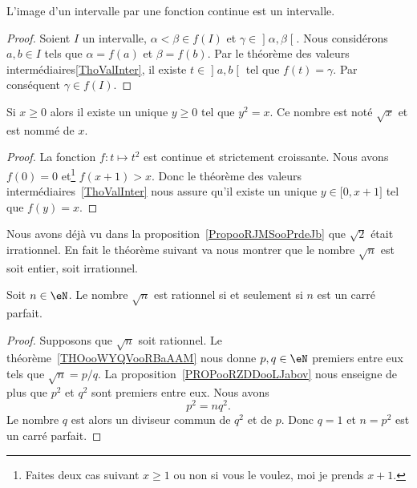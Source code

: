 \begin{corollary}       \label{CorImInterInter}
L'image d'un intervalle par une fonction continue est un intervalle.
\end{corollary}

\begin{proof}
Soient \( I\) un intervalle, \( \alpha<\beta\in f(I)\) et \( \gamma\in\mathopen] \alpha , \beta \mathclose[\). Nous considérons \(a,b\in I\) tels que \( \alpha=f(a)\) et \( \beta=f(b)\). Par le théorème des valeurs intermédiaires\ref{ThoValInter}, il existe \( t\in\mathopen] a , b \mathclose[\) tel que \( f(t)=\gamma\). Par conséquent \( \gamma\in f(I)\).
\end{proof}

\begin{corollaryDef}
    Si \( x\geq 0\) alors il existe un unique \( y\geq 0\) tel que \( y^2=x\). Ce nombre est noté \( \sqrt{x}\) et est nommé  de \( x\).
\end{corollaryDef}

\begin{proof}
    La fonction \( f\colon t\mapsto t^2\) est continue et strictement croissante. Nous avons \( f(0)=0\) et\footnote{Faites deux cas suivant \( x\geq 1\) ou non si vous le voulez, moi je prends \( x+1\).} \( f(x+1)>x\). Donc le théorème des valeurs intermédiaires~\ref{ThoValInter} nous assure qu'il existe un unique \( y\in\mathopen[ 0 , x+1 \mathclose]\) tel que \( f(y)=x\).
\end{proof}

Nous avons déjà vu dans la proposition~\ref{PropooRJMSooPrdeJb} que \( \sqrt{2}\) était irrationnel. En fait le théorème suivant va nous montrer que le nombre \( \sqrt{ n }\) est soit entier, soit irrationnel.
\begin{theorem}     \label{THOooYXJIooWcbnbm}
    Soit \( n\in \eN\). Le nombre \( \sqrt{n}\) est rationnel si et seulement si \( n\) est un carré parfait.
\end{theorem}

\begin{proof}
    Supposons que \( \sqrt{n}\) soit rationnel. Le théorème~\ref{THOooWYQVooRBaAAM} nous donne \( p,q\in \eN\) premiers entre eux tels que \( \sqrt{n}=p/q\). La proposition~\ref{PROPooRZDDooLJabov} nous enseigne de plus que \( p^2\) et \( q^2\) sont premiers entre eux. Nous avons
    \begin{equation}
        p^2=nq^2.
    \end{equation}
    Le nombre $q$ est alors un diviseur commun de \( q^2\) et de \( p\). Donc \( q=1\) et \( n=p^2\) est un carré parfait.
\end{proof}


